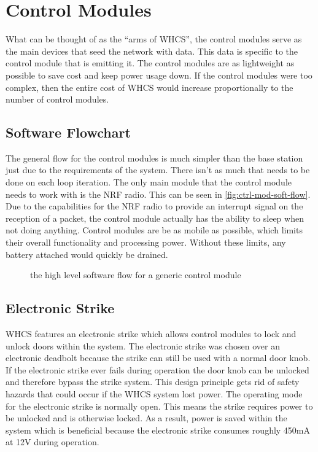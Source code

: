 \documentclass[draft,twocolumn,letterpaper,10pt]{IEEEtran}
\newcommand{\ucffig}[3]{
\begin{figure}[h]
\centering
\makebox[\linewidth][c]{
#2
}
\caption{#3}
\label{#1}
\end{figure}
}
\newcommand{\ucfgfx}[4][scale=1.0]{
\ucffig{#2}{\texttt{[image: \#3]}}{#4}
}
\begin{document}
\section{Control Modules}
What can be thought of as the ``arms of WHCS'', the control modules serve as
the main devices that seed the network with data. This data is specific to the
control module that is emitting it. The control modules are
as lightweight as possible to save cost and keep power usage down. If the
control modules were too complex, then the entire cost of WHCS would increase
proportionally to the number of control modules.

\subsection{Software Flowchart}
The general flow for the control modules is much simpler than the base station
just due to the requirements of the system. There isn't as much that needs to
be done on each loop iteration. The only main module that the control module
needs to work with is the NRF radio. This can be seen in
\autoref{fig:ctrl-mod-soft-flow}. Due to the capabilities
for the NRF radio to provide an interrupt signal on the reception of a packet,
the control module actually has the ability to sleep when not doing anything.
Control modules are be as mobile as possible, which limits their overall
functionality and processing power. Without these limits, any battery attached
would quickly be drained.

\ucfgfx[width=\linewidth]{fig:ctrl-mod-soft-flow}{control-module-flow}{the high level
software flow for a generic control module}

\subsection{Electronic Strike}

\label{sec:electronic-strike}

WHCS features an electronic strike which allows control modules to lock and
unlock doors within the system. The electronic strike was chosen over an
electronic deadbolt because the strike can still be used with a normal door
knob. If the electronic strike ever fails during operation the door knob can be
unlocked and therefore bypass the strike system. This design principle gets rid
of safety hazards that could occur if the WHCS system lost power. The operating
mode for the electronic strike is normally open. This means the strike requires
power to be unlocked and is otherwise locked. As a result, power is saved
within the system which is beneficial because the electronic strike consumes
roughly 450mA at 12V during operation.
\end{document}
